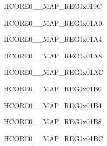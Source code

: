 \begin{register}{H}{CORE0\_\_MAP\_REG}{0x019C}\label{regdesc:CORE0USBOTG11INTMAPREG}
\end{register}\vspace{-3em}


\begin{register}{H}{CORE0\_\_MAP\_REG}{0x01A0}\label{regdesc:CORE0DMA2DINCH0INTMAPREG}
\end{register}\vspace{-3em}


\begin{register}{H}{CORE0\_\_MAP\_REG}{0x01A4}\label{regdesc:CORE0DMA2DINCH1INTMAPREG}
\end{register}\vspace{-3em}


\begin{register}{H}{CORE0\_\_MAP\_REG}{0x01A8}\label{regdesc:CORE0DMA2DOUTCH0INTMAPREG}
\end{register}\vspace{-3em}


\begin{register}{H}{CORE0\_\_MAP\_REG}{0x01AC}\label{regdesc:CORE0DMA2DOUTCH1INTMAPREG}
\end{register}\vspace{-3em}


\begin{register}{H}{CORE0\_\_MAP\_REG}{0x01B0}\label{regdesc:CORE0DMA2DOUTCH2INTMAPREG}
\end{register}\vspace{-3em}


\begin{register}{H}{CORE0\_\_MAP\_REG}{0x01B4}\label{regdesc:CORE0PSRAMMSPIINTMAPREG}
\end{register}\vspace{-3em}


\begin{register}{H}{CORE0\_\_MAP\_REG}{0x01B8}\label{regdesc:CORE0HPSYSREGINTMAPREG}
\end{register}\vspace{-3em}


\begin{register}{H}{CORE0\_\_MAP\_REG}{0x01BC}\label{regdesc:CORE0PCNTINTMAPREG}
\end{register}\vspace{-3em}




